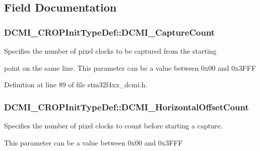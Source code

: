 \subsection{Field Documentation}
\hypertarget{struct_d_c_m_i___c_r_o_p_init_type_def_af379a3ff9fddb38be10b5f50946b55d9}{
\subsubsection[{D\-C\-M\-I\-\_\-\-Capture\-Count}]{ D\-C\-M\-I\-\_\-\-C\-R\-O\-P\-Init\-Type\-Def\-::\-D\-C\-M\-I\-\_\-\-Capture\-Count}}\label{struct_d_c_m_i___c_r_o_p_init_type_def_af379a3ff9fddb38be10b5f50946b55d9}
\begin{DoxyVerb}           Specifies the number of pixel clocks to be captured from the starting
\end{DoxyVerb}
 point on the same line. This parameter can be a value between 0x00 and 0x3\-F\-F\-F 

Definition at line 89 of file stm32f4xx\-\_\-dcmi.\-h.

\hypertarget{struct_d_c_m_i___c_r_o_p_init_type_def_a33a42e98f575145749f0003fdc99f947}{
\subsubsection[{D\-C\-M\-I\-\_\-\-Horizontal\-Offset\-Count}]{ D\-C\-M\-I\-\_\-\-C\-R\-O\-P\-Init\-Type\-Def\-::\-D\-C\-M\-I\-\_\-\-Horizontal\-Offset\-Count}}\label{struct_d_c_m_i___c_r_o_p_init_type_def_a33a42e98f575145749f0003fdc99f947}
\begin{DoxyVerb}  Specifies the number of pixel clocks to count before starting a capture.
\end{DoxyVerb}
 This parameter can be a value between 0x00 and 0x3\-F\-F\-F 

